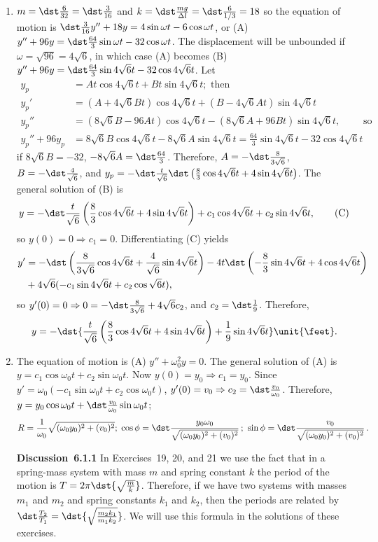 \documentclass[openany]{book}
\newenvironment{sectionSolutions}{
 \begin{enumerate}[item-label={\thesection.\arabic{enumi}.}]
}{
 \end{enumerate}
}
\begin{document}
\begin{sectionSolutions}
\item
$m=\dst\frac{6}{32}=\dst\frac{3}{16}$ and $k=\dst\frac{mg}{\Delta
l}=\dst\frac{6}{1/3}=18$ so the equation of motion is
$\dst\frac{3}{16}y''+18y=4\sin\omega t-6\cos\omega t$, or (A)
$y''+96y=\dst\frac{64}{3}\sin\omega t-32\cos\omega t$. The displacement
will be unbounded if $\omega=\sqrt{96}=4\sqrt6$, in which case (A)
becomes (B) $y''+96y=\dst\frac{64}{3}\sin4\sqrt6t-32\cos4\sqrt6t$. Let
\begin{align*}
y_p&=At\cos4\sqrt6t+Bt\sin4\sqrt6t; \text{ then}\\
y_p'&=(A+4\sqrt6Bt)\cos4\sqrt6t+(B-4\sqrt6At)\sin4\sqrt6t\\
y_p''&=(8\sqrt6B-96At)\cos4\sqrt6t-(8\sqrt6A+96Bt)\sin4\sqrt6t,
\qquad\text{ so}\\
 y_p''+96y_p&=8\sqrt6B\cos4\sqrt6t-8\sqrt6A\sin4\sqrt6t=
\frac{64}{3}\sin4\sqrt6t-32\cos4\sqrt6t
\end{align*}
if $8\sqrt6B=-32$, $-8\sqrt6A=\dst\frac{64}{3}$. Therefore,
$A=-\dst\frac{8}{3\sqrt6}$, $B=-\dst\frac{4}{\sqrt6}$, and
$y_p=-\dst\frac{t}{\sqrt6}\dst\left(\frac{8}{3}\cos4\sqrt6t+
4\sin4\sqrt6t\right)$.
The general solution of (B) is
\[
y=-\dst\frac{t}{\sqrt6}\left(\frac{8}{3}\cos4\sqrt6t+4\sin4\sqrt6t\right)
+c_1\cos4\sqrt6t+c_2\sin4\sqrt6t,
\tag{C}
\]
so $y(0)=0\Rightarrow c_1=0$. Differentiating
(C) yields
\begin{align*}
y'&=-\dst\left(\frac{8}{3\sqrt6}\cos4\sqrt6t+
\frac{4}{\sqrt6}\sin4\sqrt6t\right)
-4t\dst\left(-\frac{8}{3}\sin4\sqrt6t+
4\cos4\sqrt6t\right)\\
&+4\sqrt6(-c_1\sin4\sqrt6t+c_2\cos\sqrt6t),
\end{align*}
so $y'(0)=0\Rightarrow 0=-\dst\frac{8}{3\sqrt6}+4\sqrt6c_2$, and
$c_2=\dst\frac{1}{9}$. Therefore,
\[
y=-\dst{\frac{t}{
\sqrt6}\left(\frac{8}{3}\cos4\sqrt6t+4\sin
4\sqrt6t\right)+\frac{1}{9}\sin 4\sqrt6t}\unit{\feet}.
\]


\item
The equation of motion is (A) $y''+\omega_0^2y=0$. The general
solution of (A) is $y=c_1\cos\omega_0t+c_2\sin\omega_0t$.
Now $y(0)=y_0\Rightarrow c_1=y_0$. Since
 $y'=\omega_0(-c_1\sin\omega_0t+c_2\cos\omega_0t)$,
$y'(0)=v_0\Rightarrow c_2=\dst\frac{v_0}{\omega_0}$. Therefore,
$y=y_0\cos\omega_0 t+\dst\frac{v_0}{\omega_0}\sin\omega_0t$;
\[
R=\frac{1}{\omega_0} \sqrt{(\omega_0y_0)^2+(v_0)^2};\;
\cos\phi=\dst\frac{y_0\omega_0}{
\sqrt{(\omega_0y_0)^2+(v_0)^2}}\,;\ \sin\phi=\dst\frac{v_0}{
\sqrt{(\omega_0y_0)^2+(v_0)^2}}\,.
\]

\textbf{Discussion~6.1.1}
In Exercises~19, 20, and 21 we use
the fact that in a spring-mass system with mass $m$ and spring
constant $k$ the period of the motion is $T=2\pi\dst{\sqrt\frac{m}{
k}}$. Therefore, if we have two systems with masses $m_1$ and $m_2$
and spring constants $k_1$ and $k_2$, then the periods are related by
$\dst\frac{T_2}{ T_1}=\dst{\sqrt\frac{m_2k_1}{ m_1k_2}}$. We will use this
formula in the solutions of these exercises.



\end{sectionSolutions}
\end{document}
